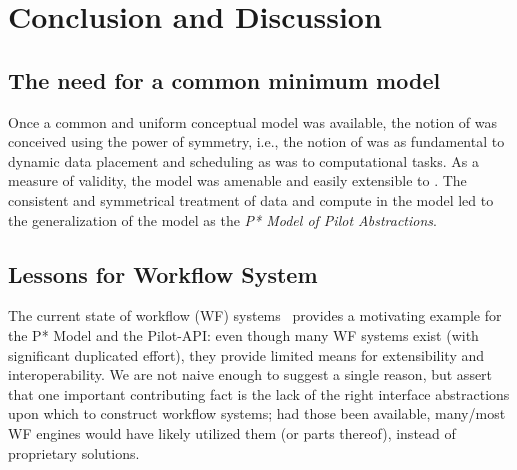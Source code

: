 \documentclass{sig-alternate}
\begin{document}


\section{Conclusion and Discussion}

\subsection{The need for a common minimum model}


Once a common and uniform conceptual model was available, the notion
of \pilotdata was conceived using the power of symmetry, i.e., the
notion of \pilotdata was as fundamental to dynamic data placement and
scheduling as \pilotjobs was to computational tasks. As a measure of
validity, the \pstar model was amenable and easily extensible to
\pilotdata.  The consistent and symmetrical treatment of data and
compute in the model led to the generalization of the model as the
{\it P* Model of Pilot Abstractions}.


\subsection{Lessons for Workflow System}

The current state of workflow (WF) systems~\cite{nsf-workflow,1196459}
provides a motivating example for the P* Model and the Pilot-API: even
though many WF systems exist (with significant duplicated effort),
they provide limited means for extensibility and interoperability.  We
are not naive enough to suggest a single reason, but assert that one
important contributing fact is the lack of the right interface
abstractions upon which to construct workflow systems; had those been
available, many/most WF engines would have likely utilized them (or
parts thereof), instead of proprietary solutions.
\end{document}
